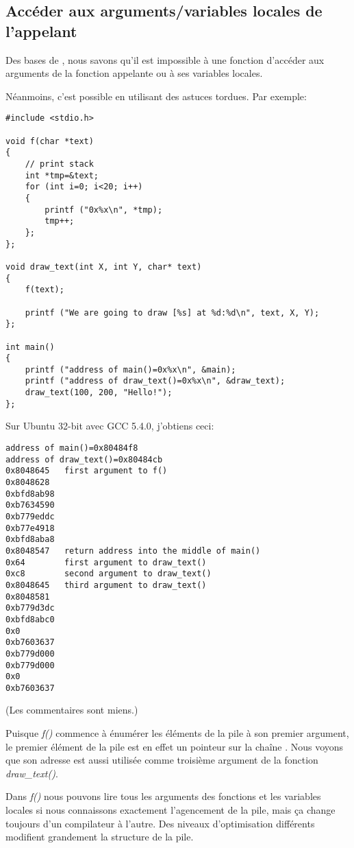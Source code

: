 \subsection{Accéder aux arguments/variables locales de l'appelant}

Des bases de \CCpp, nous savons qu'il est impossible à une fonction d'accéder aux
arguments de la fonction appelante ou à ses variables locales.

Néanmoins, c'est possible en utilisant des astuces tordues.
Par exemple:

\begin{lstlisting}[style=customc]
#include <stdio.h>

void f(char *text)
{
	// print stack
	int *tmp=&text;
	for (int i=0; i<20; i++)
	{
		printf ("0x%x\n", *tmp);
		tmp++;
	};
};

void draw_text(int X, int Y, char* text)
{
	f(text);

	printf ("We are going to draw [%s] at %d:%d\n", text, X, Y);
};

int main()
{
	printf ("address of main()=0x%x\n", &main);
	printf ("address of draw_text()=0x%x\n", &draw_text);
	draw_text(100, 200, "Hello!");
};
\end{lstlisting}

Sur Ubuntu 32-bit avec GCC 5.4.0, j'obtiens ceci:

\begin{lstlisting}
address of main()=0x80484f8
address of draw_text()=0x80484cb
0x8048645	first argument to f()
0x8048628
0xbfd8ab98
0xb7634590
0xb779eddc
0xb77e4918
0xbfd8aba8
0x8048547	return address into the middle of main()
0x64		first argument to draw_text()
0xc8		second argument to draw_text()
0x8048645	third argument to draw_text()
0x8048581
0xb779d3dc
0xbfd8abc0
0x0
0xb7603637
0xb779d000
0xb779d000
0x0
0xb7603637
\end{lstlisting}

(Les commentaires sont miens.)

Puisque \emph{f()} commence à énumérer les éléments de la pile à son premier argument,
le premier élément de la pile est en effet un pointeur sur la chaîne .
Nous voyons que son adresse est aussi utilisée comme troisième argument de la fonction
\emph{draw\_text()}.

Dans \emph{f()} nous pouvons lire tous les arguments des fonctions et les variables
locales si nous connaissons exactement l'agencement de la pile, mais ça change toujours
d'un compilateur à l'autre.
Des niveaux d'optimisation différents modifient grandement la structure de la pile.

